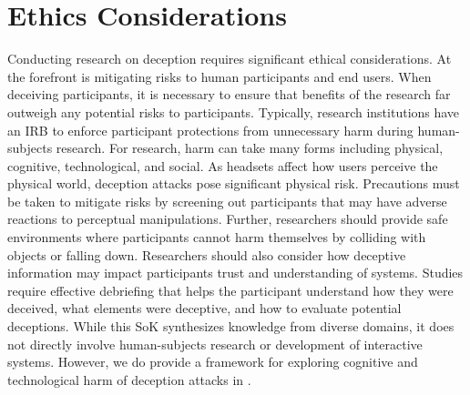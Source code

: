 \section*{Ethics Considerations}
\label{sec:ethics}

Conducting research on deception requires significant ethical considerations.
At the forefront is mitigating risks to human participants and end users.
When deceiving participants, it is necessary to ensure that benefits of the research far outweigh any potential risks to participants.
Typically, research institutions have an IRB to enforce participant protections from unnecessary harm during human-subjects research.
For \MR research, harm can take many forms including physical, cognitive, technological, and social.
As \MR headsets affect how users perceive the physical world, deception attacks pose significant physical risk.
Precautions must be taken to mitigate risks by screening out participants that may have adverse reactions to perceptual manipulations.
Further, researchers should provide safe environments where participants cannot harm themselves by colliding with objects or falling down.
Researchers should also consider how deceptive information may impact participants trust and understanding of \MR systems.
Studies require effective debriefing that helps the participant understand how they were deceived, what elements were deceptive, and how to evaluate potential deceptions.
While this SoK synthesizes knowledge from diverse domains, it does not directly involve human-subjects research or development of interactive systems.
However, we do provide a framework for exploring cognitive and technological harm of deception attacks in \MR.


